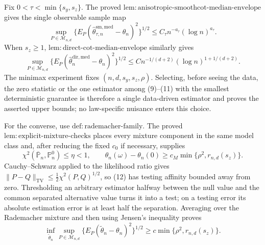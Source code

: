 Fix \(0<\tau<\min\{s_y,s_z\}\). The proved \(\mathrm{lem{:}anisotropic\text{-}smoothcot\text{-}median\text{-}envelope}\) gives the single observable sample map
\[
\sup_{P\in\mathcal M_{n,d}}
\{E_P(\widehat\theta^{\mathrm{sm,med}}_{\tau,n}-\theta_n)^2\}^{1/2}
\le C_\tau n^{-a_\tau}(\log n)^{a_\tau}.                         \tag{10}
\]
When \(s_z\ge1\), \(\mathrm{lem{:}direct\text{-}cot\text{-}median\text{-}envelope}\) similarly gives
\[
\sup_{P\in\mathcal M_{n,d}}
\{E_P(\widehat\theta_n^{\mathrm{dir,med}}-\theta_n)^2\}^{1/2}
\le C n^{-1/(d+2)}(\log n)^{1+1/(d+2)}.                            \tag{11}
\]
The minimax experiment fixes \((n,d,s_y,s_z,\rho)\). Selecting, before seeing the data, the zero statistic or the one estimator among (9)--(11) with the smallest deterministic guarantee is therefore a single data-driven estimator and proves the asserted upper bounds; no law-specific nuisance enters this choice.

For the converse, use \(\mathrm{def{:}rademacher\text{-}family}\). The proved \(\mathrm{lem{:}explicit\text{-}mixture\text{-}checks}\) places every mixture component in the same model class and, after reducing the fixed \(c_0\) if necessary, supplies
\[
\chi^2(\overline{\mathbb P}_n,\mathbb P_n^0)\le\eta<1,
\qquad
\theta_n(\omega)-\theta_n(0)\ge c_M\min\{\rho^2,r_{n,d}(s_z)\}.  \tag{12}
\]
Cauchy--Schwarz applied to the likelihood ratio gives
\(\|P-Q\|_{\mathrm{TV}}\le\frac12\chi^2(P,Q)^{1/2}\), so (12) has testing affinity bounded away from zero. Thresholding an arbitrary estimator halfway between the null value and the common separated alternative value turns it into a test; on a testing error its absolute estimation error is at least half the separation. Averaging over the Rademacher mixture and then using Jensen's inequality proves
\[
\inf_{\widetilde\theta_n}\sup_{P\in\mathcal M_{n,d}}
\{E_P(\widetilde\theta_n-\theta_n)^2\}^{1/2}
\ge c\min\{\rho^2,r_{n,d}(s_z)\}.                                 \tag{13}
\]

